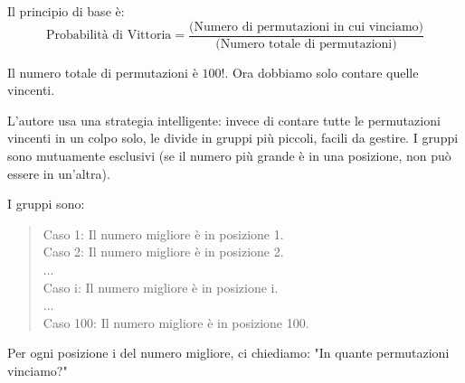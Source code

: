 Il principio di base è:
\[ \text{Probabilità di Vittoria} = \frac{\text{(Numero di permutazioni in cui vinciamo)}}{\text{(Numero totale di permutazioni)}} \]

Il numero totale di permutazioni è $100!$. Ora dobbiamo solo contare quelle vincenti.

L'autore usa una strategia intelligente: invece di contare tutte le permutazioni vincenti in un colpo solo, le divide in gruppi più piccoli, facili da gestire. I gruppi sono mutuamente esclusivi (se il numero più grande è in una posizione, non può essere in un'altra).

I gruppi sono:
\begin{quote}
    Caso 1: Il numero migliore è in posizione 1. \\
    Caso 2: Il numero migliore è in posizione 2. \\
    ... \\
    Caso i: Il numero migliore è in posizione i. \\
    ... \\
    Caso 100: Il numero migliore è in posizione 100.
\end{quote}

Per ogni posizione i del numero migliore, ci chiediamo: "In quante permutazioni vinciamo?"

